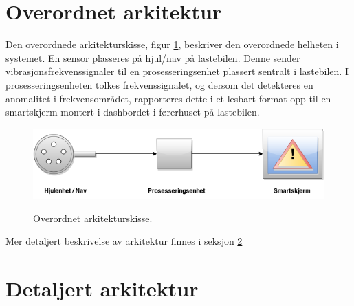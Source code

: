 \section{Overordnet arkitektur}
Den overordnede arkitekturskisse, figur \ref{fig:overordnet-ark}, 
beskriver den overordnede helheten i systemet. En sensor plasseres på 
hjul/nav på lastebilen. Denne sender vibrasjonsfrekvenssignaler til en 
prosesseringsenhet plassert sentralt i lastebilen. I prosesseringsenheten 
tolkes frekvenssignalet, og dersom det detekteres en anomalitet i 
frekvensområdet, rapporteres dette i et lesbart format opp til en 
smartskjerm montert i dashbordet i førerhuset på lastebilen.
\newline
\begin{figure}[H]
	\centering
	\includegraphics[width=1.00\textwidth]{images/arkitektur-overordnet.png}
	\label{fig:overordnet-ark}
	\caption{Overordnet arkitekturskisse.}
\end{figure}

Mer detaljert beskrivelse av arkitektur finnes i seksjon \ref{sec:arkitektur}


\section{Detaljert arkitektur} %
\label{sec:arkitektur}